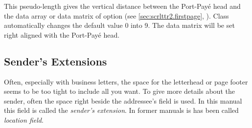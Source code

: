 \begin{Declaration}
\end{Declaration}
%
This pseudo-length gives the vertical
distance between the Port-Pay\'e head and the data array or data matrix of
option %
(see \autoref{sec:scrlttr2.firstpage},
). Class
 automatically changes the default value 0 into
9. The data matrix will be set right aligned with the Port-Pay\'e
head.%
%
%
%
%


\subsection{Sender's Extensions}
\label{sec:scrlttr2-experts.locationField}

Often, especially with business letters, the space for the letterhead or page
footer seems to be too tight to include all you want. To give more details
about the sender, often the space right beside the addressee's field is
used. In this manual this field is called the \emph{sender's extension}. In
former manuals is has been called \emph{location field}.

